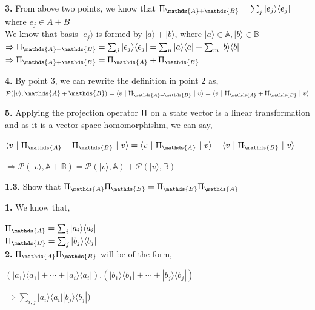 \documentclass [12pt]{article}
\theoremstyle{definition}
\newcommand{\ket}[1]{| {#1} \rangle}
\newcommand{\bra}[1]{\langle {#1} |}
\newcommand{\qp}[2]{\langle #1 \ | \ #2 \ | \ #1 \rangle}
\begin{document}
\phantom{1em} {\bf 3.} From above two points, we know that $\Uppi_{\mathds{A} + \mathds{B}} = \sum_{j}\ket{e_{j}}\bra{e_{j}}$ where $e_{j} \in A + B$\\
\phantom{1000em} We know that basis $\ket{e_{j}}$ is formed by $\ket{a} + \ket{b}$, where $ \ket{a} \in \mathds{A}, \ket{b} \in \mathds{B}$\\
\phantom{1000em} $\Rightarrow \Uppi_{\mathds{A} + \mathds{B}} = \sum_{j}\ket{e_{j}}\bra{e_{j}} = \sum_{n}\ket{a}\bra{a} + \sum_{m}\ket{b}\bra{b}$\\
\phantom{1000em} $\Rightarrow \Uppi_{\mathds{A} + \mathds{B}} = \Uppi_{\mathds{A}} + \Uppi_{\mathds{B}}$

\phantom{1em} {\bf 4.} By point 3, we can rewrite the definition in point 2 as, \\
\phantom{1000em} $\mathcal{P}(\ket{v}, \mathds{A} + \mathds{B}) =  \qp{v}{\Uppi_{\mathds{A} + \mathds{B}}} = \qp{v}{\Uppi_{\mathds{A}} + \Uppi_{\mathds{B}}}$

\phantom{1em} {\bf 5.} Applying the projection operator $\Uppi$ on a state vector is a linear transformation \\
\phantom{1000em} and as it is a vector space homomorphishm, we can say,

\phantom{1000em} $\qp{v}{\Uppi_{\mathds{A}} + \Uppi_{\mathds{B}}} = \qp{v}{\Uppi_{\mathds{A}}} + \qp{v}{\Uppi_{\mathds{B}}}$

\phantom{1000em} $\Rightarrow \mathcal{P}(\ket{v}, \mathds{A} + \mathds{B}) = \mathcal{P}(\ket{v}, \mathds{A}) + \mathcal{P}(\ket{v}, \mathds{B})$

\newpage

{\bf 1.3.} Show that $\Uppi_{\mathds{A}}\Uppi_{\mathds{B}} = \Uppi_{\mathds{B}}\Uppi_{\mathds{A}}$

\phantom{1em} {\bf 1.} We know that,

\phantom{1000em} $\Uppi_{\mathds{A}} = \sum_{i}\ket{a_{i}}\bra{a_{i}}$\\
\phantom{1000em} $\Uppi_{\mathds{B}} = \sum_{j}\ket{b_{j}}\bra{b_{j}}$\\

\phantom{1em} {\bf 2.} $\Uppi_{\mathds{A}}\Uppi_{\mathds{B}}$ will be of the form,

\phantom{1000em} $(\ket{a_{1}}\bra{a_{1}} + \dotsb + \ket{a_{i}}\bra{a_{i}}).(\ket{b_{1}}\bra{b_{1}} + \dotsb + \ket{b_{j}}\bra{b_{j}})$

\phantom{1000em} $\Rightarrow \sum_{i,j}\ket{a_{i}}\bra{a_{i}}\ket{b_{j}}\bra{b_{j}})$
\end{document}
